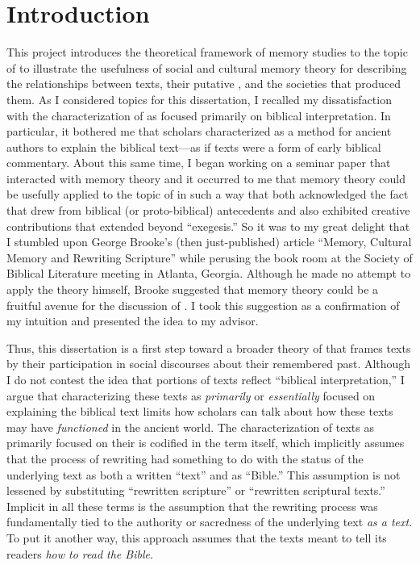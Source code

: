 
\chapter*{Introduction}


This project introduces the theoretical framework of memory studies to the topic of \rwb to illustrate the usefulness of social and cultural memory theory for describing the relationships between \rwb texts, their putative \vorlagen, and the societies that produced them. As I considered topics for this dissertation, I recalled my dissatisfaction with the characterization of \rwb as focused primarily on biblical interpretation. In particular, it bothered me that scholars characterized \rwb as a method for ancient authors to explain the biblical text---as if \rwb texts were a form of early biblical commentary. About this same time, I began working on a seminar paper that interacted with memory theory and it occurred to me that memory theory could be usefully applied to the topic of \rwb in such a way that both acknowledged the fact that \rwb drew from biblical (or proto-biblical) antecedents and also exhibited creative contributions that extended beyond ``exegesis.'' So it was to my great delight that I stumbled upon George Brooke's (then just-published) article ``Memory, Cultural Memory and Rewriting Scripture'' while perusing the book room at the Society of Biblical Literature meeting in Atlanta, Georgia.%
    \autocite{brooke_zsengeller2014}
Although he made no attempt to apply the theory himself, Brooke suggested that memory theory could be a fruitful avenue for the discussion of \rwb. I took this suggestion as a confirmation of my intuition and presented the idea to my advisor.

Thus, this dissertation is a first step toward a broader theory of \rwb that frames \rwb texts by their participation in social discourses about their remembered past. Although I do not contest the idea that portions of \rwb texts reflect ``biblical interpretation,'' I argue that characterizing these texts as \emph{primarily} or \emph{essentially} focused on explaining the biblical text limits how scholars can talk about how these texts may have \emph{functioned} in the ancient world. The characterization of \rwb texts as primarily focused on their \vorlagen is codified in the term \rwb itself, which implicitly assumes that the process of rewriting had something to do with the status of the underlying text as both a written ``text'' and as ``Bible.'' This assumption is not lessened by substituting ``rewritten scripture'' or ``rewritten scriptural texts.'' Implicit in all these terms is the assumption that the rewriting process was fundamentally tied to the authority or sacredness of the underlying text \emph{as a text}. To put it another way, this approach assumes that the \rwb texts meant to tell its readers \emph{how to read the Bible}.

